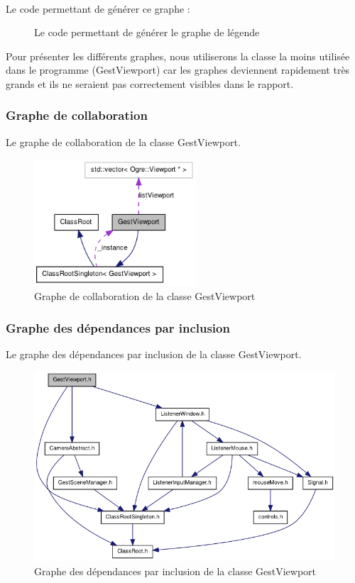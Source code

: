 \documentclass[frenchb,twoside]{EPURapport}
\begin{document}
		\
		
		Le code permettant de générer ce graphe :
		\begin{figure}[h]
			\centering
			\caption{\label{fig:graph_legend_code}Le code permettant de générer le graphe de légende}
		\end{figure}
		
		
		Pour présenter les différents graphes, nous utiliserons la classe la moins utilisée dans le programme
		(GestViewport) car les graphes deviennent rapidement très grands et ils ne seraient
		pas correctement visibles dans le rapport.
		
			\subsubsection{Graphe de collaboration}
			Le graphe de collaboration de la classe GestViewport.
			\begin{figure}[h]
				\centering
				\includegraphics[width=6cm]{images/graph_collaboration_gestviewport.png}
				\caption{\label{fig:graph_collaboration_gestviewport}Graphe de collaboration de la classe GestViewport}
			\end{figure}
			
			
			\subsubsection{Graphe des dépendances par inclusion}
			Le graphe des dépendances par inclusion de la classe GestViewport.
			\begin{figure}[h]
				\centering
				\includegraphics[width=15cm]{images/graph_dependance_gestviewport.png}
				\caption{\label{fig:graph_dependance_gestviewport}Graphe des dépendances par inclusion de la classe GestViewport}
			\end{figure}
			
\end{document}

